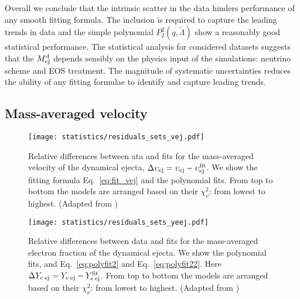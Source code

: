 Overall we conclude that the intrinsic scatter in the data hinders performance 
of any smooth fitting formula. The inclusion \mr{} is required to capture the leading 
trends in data and the simple polynomial $P_2^2(q,\tilde{\Lambda})$ show a reasonably 
good statistical performance.
The statistical analysis for considered datasets suggests that the $M^{\text{d}}_{\text{ej}}$ depends 
sensibly on the physics input of the simulations: neutrino scheme and \ac{EOS} treatment.
The magnitude of systematic uncertainties reduces the ability of any fitting formulae 
to identify and capture leading trends.



\subsection{Mass-averaged velocity}

\begin{figure}[t]
    \centering 
    \texttt{[image: statistics/residuals\_sets\_vej.pdf]}
    \caption{
        Relative differences between ata and fits for the mass-averaged velocity of the dynamical ejecta, $\Delta \upsilon_{\rm ej} = \upsilon_{\rm ej} - \upsilon^{\rm fit}_{\rm ej}$.
        We show the fitting formula Eq.~\eqref{eq:fit_vej} and the polynomial fits.
        From top to bottom the models are arranged based on their $\chi_{\nu}^2$: from lowest to highest.
        (Adapted from \citet{Nedora:2020qtd})
    }
    \label{fig:ejecta:dyn:v}
\end{figure}

\begin{figure}[t]
    \centering 
    \texttt{[image: statistics/residuals\_sets\_yeej.pdf]}
    \caption{
        Relative differences between data and fits for the 
        mass-averaged electron fraction of the dynamical ejecta.
        We show the polynomial fits, and Eq.~\eqref{eq:polyfit2} and Eq.~\eqref{eq:polyfit22}.
        Here $\Delta Y_{e\: \rm ej} = Y_{e\: \rm ej} - Y^{\rm fit}_{e\: \rm ej}$.
        From top to bottom the models are arranged based on their $\chi_{\nu}^2$: from lowest to highest.
        (Adapted from \citet{Nedora:2020qtd})
    }
    \label{fig:ejecta:dyn:y}
\end{figure}

